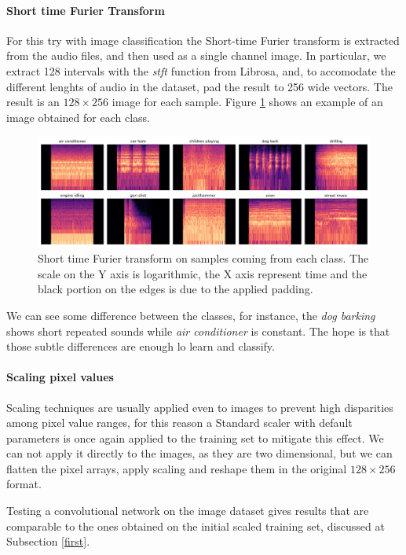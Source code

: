 \paragraph{Short time Furier Transform}
For this try with image classification the Short-time Furier transform 
is extracted from the audio files, and then used as a single channel image. 
In particular, we extract 128 intervals with the \emph{stft} function from Librosa, and, to accomodate 
the different lenghts of audio in the dataset, pad the result to 256 wide vectors.
The result is an $128 \times 256$ image for each sample. Figure \ref{img}
shows an example of an image obtained for each class.

\begin{figure}
    \includegraphics[width=\textwidth]{images/class_images.png}  
    \caption{Short time Furier transform on samples coming from each class.
    The scale on the Y axis is logarithmic, the X axis represent time and 
    the black portion on the edges is due to the applied padding.}  
    \label{img}
\end{figure}

We can see some difference between the classes, for instance, the \emph{dog barking}
shows short repeated sounds while \emph{air conditioner}
is constant. The hope is that those subtle differences are enough lo learn and classify.

\paragraph{Scaling pixel values}
Scaling techniques  are usually applied even to images to prevent high disparities 
among pixel value ranges, for this reason a Standard scaler with default parameters is 
once again applied to the training set to mitigate this effect.
We can not apply it directly to the images, as they are two dimensional, but we can 
flatten the pixel arrays, apply scaling and reshape them in the original $128 \times 256$ format.

Testing a convolutional network 
on the image dataset gives results that are comparable to the ones obtained on the initial scaled training 
set, discussed at Subsection \vref{first}.
\newpage